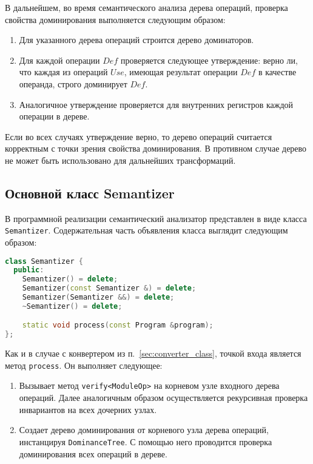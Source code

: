 В дальнейшем, во время семантического анализа дерева операций, проверка свойства доминирования выполняется следующим образом:

\begin{enumerate}
    \item Для указанного дерева операций строится дерево доминаторов.
    \item Для каждой операции \(Def\) проверяется следующее утверждение: верно ли, что каждая из операций \(Use\), имеющая результат операции \(Def\) в качестве операнда, строго доминирует \(Def\).
    \item Аналогичное утверждение проверяется для внутренних регистров каждой операции в дереве. 
\end{enumerate}

Если во всех случаях утверждение верно, то дерево операций считается корректным с точки зрения свойства доминирования.
В противном случае дерево не может быть использовано для дальнейших трансформаций.

\subsection{Основной класс Semantizer}

В программной реализации семантический анализатор представлен в виде класса \verb|Semantizer|.
Содержательная часть объявления класса выглядит следующим образом:

\begin{lstlisting}[language=C++, caption=Объявление класса Semantizer]
class Semantizer {
  public:
    Semantizer() = delete;
    Semantizer(const Semantizer &) = delete;
    Semantizer(Semantizer &&) = delete;
    ~Semantizer() = delete;

    static void process(const Program &program);
};
\end{lstlisting}

Как и в случае с конвертером из п.~\ref{sec:converter_class}, точкой входа является метод \verb|process|.
Он выполняет следующее:

\begin{enumerate}
    \item Вызывает метод \verb|verify<ModuleOp>| на корневом узле входного дерева операций.
          Далее аналогичным образом осуществляется рекурсивная проверка инвариантов на всех дочерних узлах.
    \item Создает дерево доминирования от корневого узла дерева операций, инстанцируя \verb|DominanceTree|.
          С помощью него проводится проверка доминирования всех операций в дереве.
\end{enumerate}
